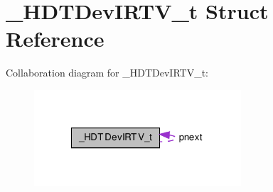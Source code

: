\hypertarget{struct___h_d_t_dev_i_r_t_v__t}{\section{\-\_\-\-H\-D\-T\-Dev\-I\-R\-T\-V\-\_\-t \-Struct \-Reference}
\label{struct___h_d_t_dev_i_r_t_v__t}
}


\-Collaboration diagram for \-\_\-\-H\-D\-T\-Dev\-I\-R\-T\-V\-\_\-t\-:\nopagebreak
\begin{figure}[H]
\begin{center}
\leavevmode
\includegraphics[width=218pt]{struct___h_d_t_dev_i_r_t_v__t__coll__graph}
\end{center}
\end{figure}

